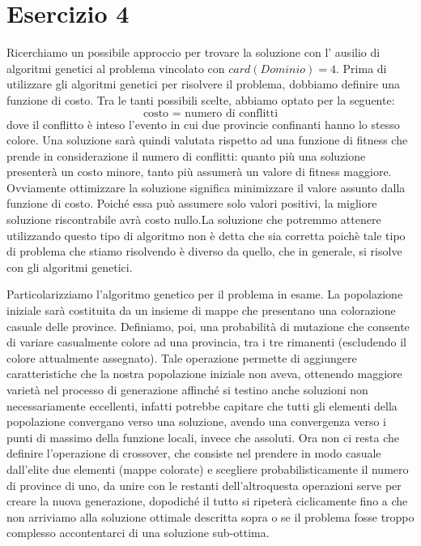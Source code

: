 	\section{Esercizio 4}
		\label{sec:es4}
		Ricerchiamo un possibile approccio per trovare la soluzione con l' ausilio di algoritmi genetici al problema vincolato con $card(Dominio)=4$. Prima di utilizzare gli algoritmi genetici per risolvere il problema, dobbiamo definire una funzione di costo. Tra le tanti possibili scelte, abbiamo optato per la seguente: 
		\begin{equation*}
			\mbox{costo }=\mbox{ numero di conflitti}
		\end{equation*}
		dove il conflitto è inteso l'evento in cui due provincie confinanti hanno lo stesso colore. Una soluzione sarà quindi valutata rispetto ad una funzione di fitness che prende in considerazione il numero di conflitti: quanto più una soluzione presenterà un costo minore, tanto più assumerà un valore di fitness maggiore. Ovviamente ottimizzare la soluzione significa minimizzare il valore assunto dalla funzione di costo. Poiché essa può assumere solo valori positivi, la migliore soluzione riscontrabile avrà costo nullo.La soluzione che potremmo attenere utilizzando questo tipo di algoritmo non è detta che sia corretta poichè tale tipo di problema che stiamo risolvendo è diverso da quello, che in generale, si risolve con gli algoritmi genetici.\par
		Particolarizziamo l'algoritmo genetico per il problema in esame. La popolazione iniziale sarà costituita da un insieme di mappe che presentano una colorazione casuale delle province. Definiamo, poi, una probabilità di mutazione che consente di variare casualmente colore ad una provincia, tra i tre rimanenti (escludendo il colore attualmente assegnato). Tale operazione permette di aggiungere caratteristiche che la nostra popolazione iniziale non aveva, ottenendo maggiore varietà nel processo di generazione affinché si testino anche soluzioni non necessariamente eccellenti, infatti potrebbe capitare che tutti gli elementi della popolazione convergano verso una soluzione, avendo una convergenza verso i punti di massimo della funzione locali, invece che assoluti. Ora non ci resta che definire l'operazione di crossover, che consiste nel prendere in modo casuale dall'elite due elementi (mappe colorate) e scegliere probabilisticamente il numero di province di uno, da unire con le restanti dell'altroquesta operazioni serve per creare la nuova generazione, dopodiché il tutto si ripeterà ciclicamente fino a che non arriviamo alla soluzione ottimale descritta sopra o se il problema fosse troppo complesso accontentarci di una soluzione sub-ottima.
